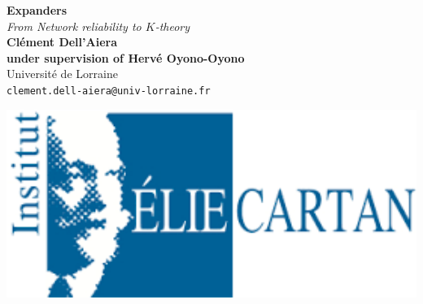 \documentclass[a0,portrait]{a0poster}
\begin{document}


\begin{minipage}[b]{0.75\linewidth}
\veryHuge \color{NavyBlue} \textbf{Expanders} \color{Black}\\ %
\Huge\textit{From Network reliability to $K$-theory}\\[2cm] %
\huge \textbf{Cl\'ement Dell'Aiera \\under supervision of Herv\'e Oyono-Oyono}\\[0.5cm] %
\huge Universit\'e de Lorraine\\[0.4cm] %
\Large \texttt{clement.dell-aiera@univ-lorraine.fr} \\
\end{minipage}
%
\begin{minipage}[b]{0.25\linewidth}
\includegraphics[width=20cm]{IECL.png}\\
\end{minipage}

\vspace{1cm} %

\end{document}
